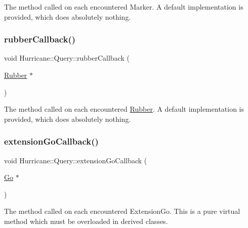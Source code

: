 The method called on each encountered Marker. A default implementation is provided, which does absolutely nothing. \mbox{\label{classHurricane_1_1Query_acec322581e35c1556ce706aa5ea66aa3}} 
\subsubsection{\texorpdfstring{rubber\+Callback()}{rubberCallback()}}
{\footnotesize\ttfamily void Hurricane\+::\+Query\+::rubber\+Callback (\begin{DoxyParamCaption}\item[{\hyperlink{classHurricane_1_1Rubber}{Rubber} $\ast$}]{ }\end{DoxyParamCaption})\hspace{0.3cm}{\ttfamily [virtual]}}

The method called on each encountered \hyperlink{classHurricane_1_1Rubber}{Rubber}. A default implementation is provided, which does absolutely nothing. \mbox{\label{classHurricane_1_1Query_a75b87e969b64caaf24ec058c0d2dfa68}} 
\subsubsection{\texorpdfstring{extension\+Go\+Callback()}{extensionGoCallback()}}
{\footnotesize\ttfamily void Hurricane\+::\+Query\+::extension\+Go\+Callback (\begin{DoxyParamCaption}\item[{\hyperlink{classHurricane_1_1Go}{Go} $\ast$}]{ }\end{DoxyParamCaption})\hspace{0.3cm}{\ttfamily [pure virtual]}}

The method called on each encountered Extension\+Go. This is a pure virtual method which must be overloaded in derived classes. \mbox{\label{classHurricane_1_1Query_abaf97e93c7fa96469adf64f7865938b4}} 

